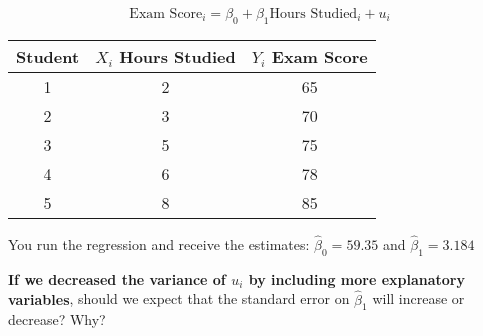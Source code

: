 \documentclass[12pt]{exam}
\begin{document}
\begin{questions}
$$
    \text{Exam Score}_{i} = \beta_{0} + \beta_{1} \text{Hours Studied}_{i} + u_{i}
$$

\begin{table}[ht]
    \centering 
    \begin{tabular}{ccc}
        \toprule 
        Student & $X_{i}$ Hours Studied & $Y_{i}$ Exam Score \\
        \midrule
        1       &           2           &        65          \\
        2       &           3           &        70          \\
        3       &           5           &        75          \\
        4       &           6           &        78          \\
        5       &           8           &        85          \\       
        \bottomrule 
    \end{tabular}
\end{table}

You run the regression and receive the estimates: $\hat{\beta}_{0} = 59.35$ and $\hat{\beta}_{1} = 3.184$


\question %
\textbf{If we decreased the variance of $u_{i}$ by including more explanatory variables}, should we expect that the standard error on $\hat{\beta}_{1}$ will increase or decrease? Why?

\end{questions}
\end{document}
